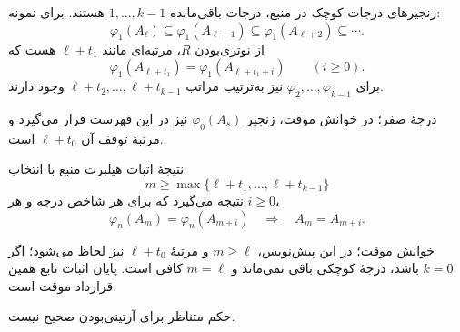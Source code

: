 \begin{frame}[t]{زنجیرهای درجات کوچک}
    \label{lec12:low-degree-stabilization}
    در منبع، درجات باقی‌مانده $1,\ldots,k-1$ هستند.
    برای نمونه:
    \[
        \varphi_1(A_\ell)\subseteq\varphi_1(A_{\ell+1})
        \subseteq\varphi_1(A_{\ell+2})\subseteq\cdots.
    \]
    از نوتری‌بودن $R$، مرتبه‌ای مانند $\ell+t_1$ هست که
    \[
        \varphi_1(A_{\ell+t_1})
        =\varphi_1(A_{\ell+t_1+i})\qquad(i\geq0).
    \]
    برای $\varphi_2,\ldots,\varphi_{k-1}$ نیز به‌ترتیب
    مراتب $\ell+t_2,\ldots,\ell+t_{k-1}$ وجود دارند.
    \begin{alertblock}{درجهٔ صفر؛ }
        در خوانش موقت، زنجیر $\varphi_0(A_s)$ نیز در این فهرست قرار می‌گیرد
        و مرتبهٔ توقف آن $\ell+t_0$ است.
    \end{alertblock}
\end{frame}

\begin{frame}[t]{نتیجهٔ اثبات هیلبرت}
    \label{lec12:hilbert-conclusion}
    منبع با انتخاب
    \[
        m\geq\max\{\ell+t_1,\ldots,\ell+t_{k-1}\}
    \]
    نتیجه می‌گیرد که برای هر شاخص درجه و هر $i\geq0$،
    \[
        \varphi_n(A_m)=\varphi_n(A_{m+i})
        \quad\Longrightarrow\quad A_m=A_{m+i}.
    \]
    \begin{alertblock}{خوانش موقت؛ }
        در این پیش‌نویس، $m\geq\ell$ و مرتبهٔ $\ell+t_0$ نیز لحاظ می‌شود؛
        اگر $k=0$ باشد، درجهٔ کوچکی باقی نمی‌ماند و $m=\ell$ کافی است.
        پایان اثبات تابع همین قرارداد موقت است.
    \end{alertblock}
    \begin{remark}
        حکم متناظر برای آرتینی‌بودن صحیح نیست.
    \end{remark}
\end{frame}


